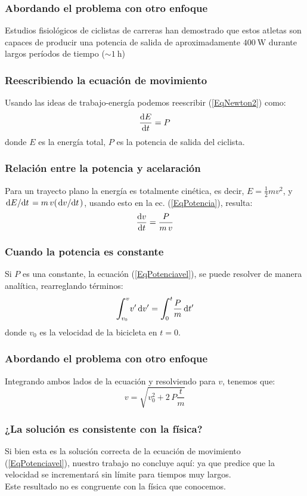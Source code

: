 \documentclass[12pt]{beamer}
\begin{document}
\begin{frame}
\frametitle{Abordando el problema con otro enfoque}
Estudios fisiológicos de ciclistas de carreras han demostrado que estos atletas son capaces de producir una potencia de salida de aproximadamente $\SI{400}{\watt}$ durante largos períodos de tiempo ($\sim \SI{1}{\hour}$)
\end{frame}
\begin{frame}
\frametitle{Reescribiendo la ecuación de movimiento}
Usando las ideas de trabajo-energía podemos reescribir (\ref{EqNewton2}) como:
\pause
\begin{equation}
\dv{E}{t} = P
\label{EqPotencia}
\end{equation}
donde $E$ es la energía total, $P$ es la potencia de salida del ciclista.
\end{frame}
\begin{frame}
\frametitle{Relación entre la potencia y acelaración}
Para un trayecto plano la energía es totalmente cinética, es decir, $E = \frac{1}{2} m v^{2}$, y $\dv*{E}{t} = m \, v (\dv*{v}{t})$, usando esto en la ec. (\ref{EqPotencia}), resulta:
\pause
\begin{equation}
\dv{v}{t} = \dfrac{P}{m \, v}
\label{EqPotenciavel}
\end{equation}
\end{frame}
\begin{frame}
\frametitle{Cuando la potencia es constante}
Si $P$ es una constante, la ecuación (\ref{EqPotenciavel}), se puede resolver de manera analítica, rearreglando términos:
\pause
\begin{equation}
\scaleint{6ex}_{\bs v_{0}}^{v} v^{\prime} \dd{v^{\prime}} = \scaleint{6ex}_{\bs 0}^{t} \dfrac{P}{m} \dd{t^{\prime}}
\label{EqIntegral}
\end{equation}
donde $v_{0}$ es la velocidad de la bicicleta en $t = 0$.
\end{frame}
\begin{frame}
\frametitle{Abordando el problema con otro enfoque}
Integrando ambos lados de la ecuación y resolviendo para $v$, tenemos que:
\pause
\begin{equation}\label{Eqvres}
v = \sqrt{v_{0}^{2} + 2 \, P \dfrac{t}{m}}
\end{equation}
\end{frame}
\begin{frame}
\frametitle{¿La solución es consistente con la física?}
Si bien esta es la solución correcta de la ecuación de movimiento (\ref{EqPotenciavel}), nuestro trabajo no concluye aquí: \pause ya que predice que \textcolor{lava}{la velocidad se incrementará sin límite para tiempos muy largos}.
\\
\bigskip
\pause
Este resultado no es congruente con la física que conocemos.

\end{frame}
\end{document}
